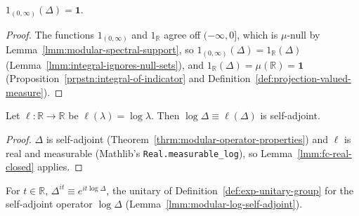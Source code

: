 \begin{lemma}[$1_{(0, \infty)}(\Delta) = \mathbf{1}$]
    \label{lmm:modular-indicator-positive-one}
    \leanok
    $1_{(0, \infty)}(\Delta) = \mathbf{1}$.
\end{lemma}
\begin{proof}
    \leanok
    The functions $1_{(0, \infty)}$ and $1_{\mathbb{R}}$ agree off $(-\infty, 0]$, which is $\mu$-null by Lemma~\ref{lmm:modular-spectral-support}, so $1_{(0, \infty)}(\Delta) = 1_{\mathbb{R}}(\Delta)$ (Lemma~\ref{lmm:integral-ignores-null-sets}), and $1_{\mathbb{R}}(\Delta) = \mu(\mathbb{R}) = \mathbf{1}$ (Proposition~\ref{prpstn:integral-of-indicator} and Definition~\ref{def:projection-valued-measure}).
\end{proof}

\begin{lemma}
    \label{lmm:modular-log-self-adjoint}
    \leanok
    Let $\ell : \mathbb{R} \to \mathbb{R}$ be $\ell(\lambda) = \log\lambda$. Then $\log\Delta \equiv \ell(\Delta)$ is self-adjoint.
\end{lemma}
\begin{proof}
    \leanok
    $\Delta$ is self-adjoint (Theorem~\ref{thrm:modular-operator-properties}) and $\ell$ is real and measurable (Mathlib's \texttt{Real.measurable\_log}), so Lemma~\ref{lmm:fc-real-closed} applies.
\end{proof}

\begin{definition}
    \label{def:modular-unitary-group}
    \leanok
    For $t \in \mathbb{R}$, $\Delta^{it} \equiv e^{it\log\Delta}$, the unitary of Definition~\ref{def:exp-unitary-group} for the self-adjoint operator $\log\Delta$ (Lemma~\ref{lmm:modular-log-self-adjoint}).
\end{definition}

